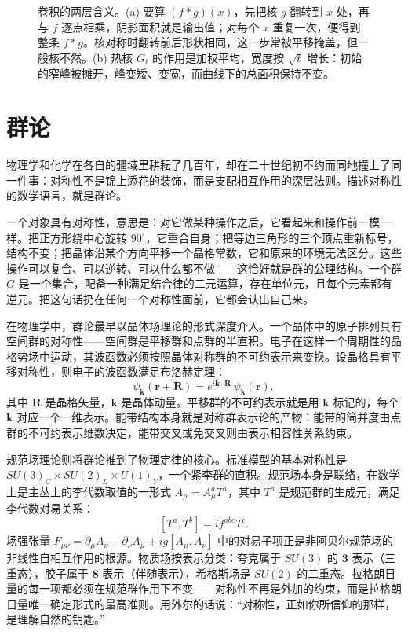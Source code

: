\documentclass[UTF8]{ctexbook}
\begin{document}
\begin{figure}[H]
  \caption{卷积的两层含义。(a) 要算 $(f*g)(x)$，先把核 $g$ 翻转到 $x$ 处，再与 $f$ 逐点相乘，阴影面积就是输出值；对每个 $x$ 重复一次，便得到整条 $f*g$。核对称时翻转前后形状相同，这一步常被平移掩盖，但一般核不然。(b) 热核 $G_t$ 的作用是加权平均，宽度按 $\sqrt t$ 增长：初始的窄峰被摊开，峰变矮、变宽，而曲线下的总面积保持不变。}
  \label{fig:convolution}
\end{figure}

\chapter{群论}

物理学和化学在各自的疆域里耕耘了几百年，却在二十世纪初不约而同地撞上了同一件事：对称性不是锦上添花的装饰，而是支配相互作用的深层法则。描述对称性的数学语言，就是群论。

一个对象具有对称性，意思是：对它做某种操作之后，它看起来和操作前一模一样。把正方形绕中心旋转 $90^\circ$，它重合自身；把等边三角形的三个顶点重新标号，结构不变；把晶体沿某个方向平移一个晶格常数，它和原来的环境无法区分。这些操作可以复合、可以逆转、可以什么都不做——这恰好就是群的公理结构。一个群 $G$ 是一个集合，配备一种满足结合律的二元运算，存在单位元，且每个元素都有逆元。把这句话扔在任何一个对称性面前，它都会认出自己来。

在物理学中，群论最早以晶体场理论的形式深度介入。一个晶体中的原子排列具有空间群的对称性——空间群是平移群和点群的半直积。电子在这样一个周期性的晶格势场中运动，其波函数必须按照晶体对称群的不可约表示来变换。设晶格具有平移对称性，则电子的波函数满足布洛赫定理：
\[
\psi_{\mathbf{k}}(\mathbf{r}+\mathbf{R})=e^{i\mathbf{k}\cdot\mathbf{R}}\,\psi_{\mathbf{k}}(\mathbf{r}),
\]
其中 $\mathbf{R}$ 是晶格矢量，$\mathbf{k}$ 是晶体动量。平移群的不可约表示就是用 $\mathbf{k}$ 标记的，每个 $\mathbf{k}$ 对应一个一维表示。能带结构本身就是对称群表示论的产物：能带的简并度由点群的不可约表示维数决定，能带交叉或免交叉则由表示相容性关系约束。

规范场理论则将群论推到了物理定律的核心。标准模型的基本对称性是 $SU(3)_C\times SU(2)_L\times U(1)_Y$，一个紧李群的直积。规范场本身是联络，在数学上是主丛上的李代数取值的一形式 $A_\mu=A_\mu^a T^a$，其中 $T^a$ 是规范群的生成元，满足李代数对易关系：
\[
[T^a,T^b]=if^{abc}T^c.
\]
场强张量 $F_{\mu\nu}=\partial_\mu A_\nu-\partial_\nu A_\mu+ig[A_\mu,A_\nu]$ 中的对易子项正是非阿贝尔规范场的非线性自相互作用的根源。物质场按表示分类：夸克属于 $SU(3)$ 的 $\mathbf{3}$ 表示（三重态），胶子属于 $\mathbf{8}$ 表示（伴随表示），希格斯场是 $SU(2)$ 的二重态。拉格朗日量的每一项都必须在规范群作用下不变——对称性不再是外加的约束，而是拉格朗日量唯一确定形式的最高准则。用外尔的话说：“对称性，正如你所信仰的那样，是理解自然的钥匙。”
\end{document}
